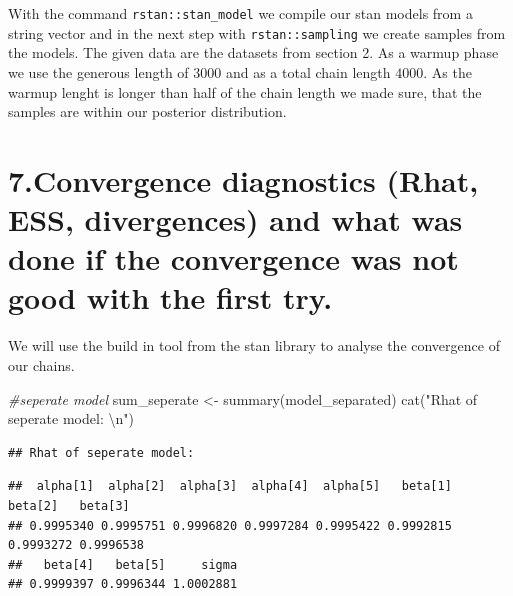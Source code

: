 \documentclass[
]{article}
\newenvironment{Shaded}{\begin{snugshade}}{\end{snugshade}}
\newcommand{\CommentTok}[1]{\textcolor[rgb]{0.56,0.35,0.01}{\textit{#1}}}
\newcommand{\DecValTok}[1]{\textcolor[rgb]{0.00,0.00,0.81}{#1}}
\newcommand{\FunctionTok}[1]{\textcolor[rgb]{0.00,0.00,0.00}{#1}}
\newcommand{\NormalTok}[1]{#1}
\newcommand{\OtherTok}[1]{\textcolor[rgb]{0.56,0.35,0.01}{#1}}
\newcommand{\SpecialCharTok}[1]{\textcolor[rgb]{0.00,0.00,0.00}{#1}}
\newcommand{\StringTok}[1]{\textcolor[rgb]{0.31,0.60,0.02}{#1}}
\begin{document}
With the command \texttt{rstan::stan\_model} we compile our stan models
from a string vector and in the next step with \texttt{rstan::sampling}
we create samples from the models. The given data are the datasets from
section 2. As a warmup phase we use the generous length of \(3000\) and
as a total chain length \(4000\). As the warmup lenght is longer than
half of the chain length we made sure, that the samples are within our
posterior distribution.

\hypertarget{convergence-diagnostics-rhat-ess-divergences-and-what-was-done-if-the-convergence-was-not-good-with-the-first-try.}{%
\section{7.Convergence diagnostics (Rhat, ESS, divergences) and what was
done if the convergence was not good with the first
try.}\label{convergence-diagnostics-rhat-ess-divergences-and-what-was-done-if-the-convergence-was-not-good-with-the-first-try.}}

We will use the build in tool from the stan library to analyse the
convergence of our chains.

\begin{Shaded}
\begin{Highlighting}[]
\CommentTok{\#seperate model}
\NormalTok{sum\_seperate }\OtherTok{\textless{}{-}} \FunctionTok{summary}\NormalTok{(model\_separated)}
\FunctionTok{cat}\NormalTok{(}\StringTok{"Rhat of seperate model: }\SpecialCharTok{\textbackslash{}n}\StringTok{"}\NormalTok{)}
\end{Highlighting}
\end{Shaded}

\begin{verbatim}
## Rhat of seperate model:
\end{verbatim}

\begin{Shaded}
\end{Shaded}

\begin{verbatim}
##  alpha[1]  alpha[2]  alpha[3]  alpha[4]  alpha[5]   beta[1]   beta[2]   beta[3] 
## 0.9995340 0.9995751 0.9996820 0.9997284 0.9995422 0.9992815 0.9993272 0.9996538 
##   beta[4]   beta[5]     sigma 
## 0.9999397 0.9996344 1.0002881
\end{verbatim}
\end{document}
